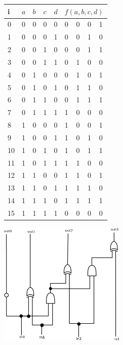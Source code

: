 \documentclass[10pt,a4paper]{scrartcl}
\begin{document}
\begin{tabular}{|l||l|l|l|l||l|l|l|l|}\hline
i & $a$ & $b$ & $c$ & $d$ & \multicolumn{4}{|c|}{$f(a,b,c,d)$} \\\hline\hline
0 & 0 & 0 & 0 & 0 &    0 & 0 & 0 & 1 \\\hline
1 & 0 & 0 & 0 & 1 &    0 & 0 & 1 & 0 \\\hline
2 & 0 & 0 & 1 & 0 &    0 & 0 & 1 & 1 \\\hline
3 & 0 & 0 & 1 & 1 &    0 & 1 & 0 & 0 \\\hline
4 & 0 & 1 & 0 & 0 &    0 & 1 & 0 & 1 \\\hline
5 & 0 & 1 & 0 & 1 &    0 & 1 & 1 & 0 \\\hline
6 & 0 & 1 & 1 & 0 &    0 & 1 & 1 & 1 \\\hline
7 & 0 & 1 & 1 & 1 &    1 & 0 & 0 & 0 \\\hline
8 & 1 & 0 & 0 & 0 &    1 & 0 & 0 & 1 \\\hline
9 & 1 & 0 & 0 & 1 &    1 & 0 & 1 & 0 \\\hline
10 & 1 & 0 & 1 & 0 &   1 & 0 & 1 & 1 \\\hline
11 & 1 & 0 & 1 & 1 &   1 & 1 & 0 & 0 \\\hline
12 & 1 & 1 & 0 & 0 &   1 & 1 & 0 & 1 \\\hline
13 & 1 & 1 & 0 & 1 &   1 & 1 & 1 & 0 \\\hline
14 & 1 & 1 & 1 & 0 &   1 & 1 & 1 & 1 \\\hline
15 & 1 & 1 & 1 & 1 &   0 & 0 & 0 & 0 \\\hline
\end{tabular}
\hspace{1cm}
\includegraphics[width=6cm]{2-4.png}
\end{document}
